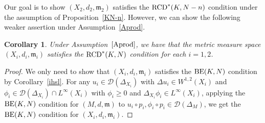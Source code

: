 \documentclass[10pt,a4paper]{amsart}
\numberwithin{equation}{section}
\newtheorem{Cor}[Thm]{Corollary}
\theoremstyle{definition}
\newcommand{\mf}{\mathfrak{m}}
\newcommand{\RCD}{{\rm RCD}^\ast}
\newcommand{\BE}{{\rm BE}}
\newcommand{\D}{\mathcal{D}}
\begin{document}
Our goal is to show $(X_2,d_2,\mf_2)$ satisfies the $\RCD(K,N-n)$ condition under the assumption of Proposition~\ref{KN-n}.
However, we can show the following weaker assertion under Assumption~\ref{Aprod}.
\begin{Cor}
Under Assumption~$\ref{Aprod}$, we have that the metric measure space $(X_i,d_i,\mf_i)$ satisfies the $\RCD(K,N)$ condition for each $i=1,2$.
\end{Cor}
\begin{proof}
We only need to show that $(X_i,d_i,\mf_i)$ satisfies the $\BE(K,N)$ condition by Corollary~\ref{ihsl}.
For any $u_i\in\D(\Delta_{X_i})$ with $\Delta u_i\in W^{1,2}(X_i)$ and $\phi_i\in\D(\Delta_{X_i})\cap L^\infty(X_i)$ with $\phi_i\geq 0$ and $\Delta_{X_i}\phi_i\in L^\infty(X_i)$, applying the $\BE(K,N)$ condition for $(M,d,\mf)$ to $u_i\circ p_i, \phi_i\circ p_i\in\D(\Delta_M)$, we get the $\BE(K,N)$ condition for $(X_i,d_i,\mf_i)$.
\end{proof}
\end{document}
